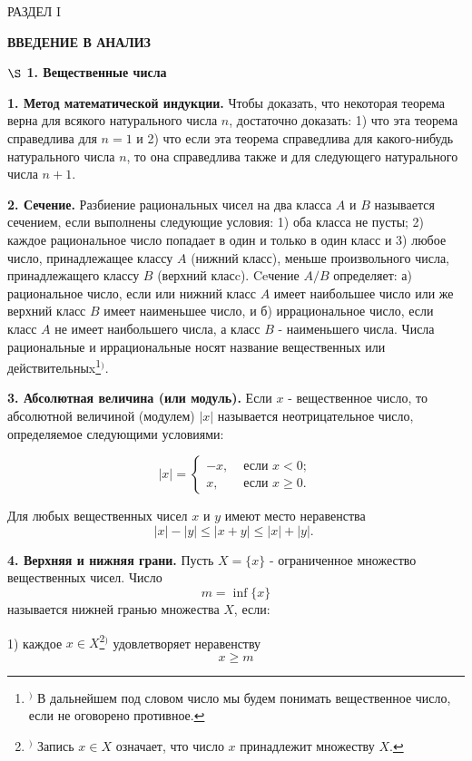 \documentclass[12pt]{book}
\begin{document}
\begin{center}
\large\textsc{{РАЗДЕЛ I}}
\vspace{0.5cm} 

\Large{\textbf{ВВЕДЕНИЕ В АНАЛИЗ}}

\vspace{4cm} 

\textbf{\large{$\S$ 1. Вещественные числа}}
\end{center}

\textbf{1. Метод математической индукции.} Чтобы доказать, что некоторая теорема верна для всякого натурального числа $n$, достаточно доказать: 1) что эта теорема справедлива для $n=1$ и 2) что если эта теорема справедлива для какого-нибудь натурального числа $n$, то она справедлива также и для следующего натурального числа $n+1$.

\textbf{2. Сечение.} Разбиение рациональных чисел на два класса $A$ и $B$ называется сечением, если выполнены следующие условия: 1) оба класса не пусты; 2) каждое рациональное число попадает в один и только в один класс и 3) любое число, принадлежащее классу $A$ (нижний класс), меньше произвольного числа, принадлежащего классу $B$ (верхний класc). Ceчение $A / B$ определяет: а) рациональное число, если или нижний класс $A$ имеет наибольшее число или же верхний класс $B$ имеет наименьшее число, и б) иррациональное число, если класс $A$ не имеет наибольшего числа, а класс $B$ - наименьшего числа. Числа рациональные и иррациональные носят название вещественных или действительныx\footnote{$^{)}$ В дальнейшем под словом число мы будем понимать вещественное число, если не оговорено противное.}$^{)}$.

\textbf{3. Абсолютная величина (или модуль).} Если $x$ - вещественное число, то абсолютной величиной (модулем) $|x|$ называется неотрицательное число, определяемое следующими условиями:

$$
|x|=\left\{\begin{aligned}
-x, & \text { если } x<0; \\
x, & \text { если } x \geqslant 0 .
\end{aligned}\right.
$$

Для любых вещественных чисел $x$ и $y$ имеют место неравенства
$$
|x|-|y| \leqslant|x+y| \leqslant|x|+|y| \text {. }
$$

\textbf{4. Верхняя и нижняя грани.} Пусть $X=\{x\}$ - ограниченное множество вещественных чисел. Число
$$
m=\inf \{x\}
$$ 
называется нижней гранью множества $X$, если:

1) каждое $x \in X$\footnote{$^{)}$ Запись $x \in X$ означает, что число $x$ принадлежит множеству $X$.}$^{)}$
 удовлетворяет неравенству
$$
x \geqslant m
$$
\end{document}
